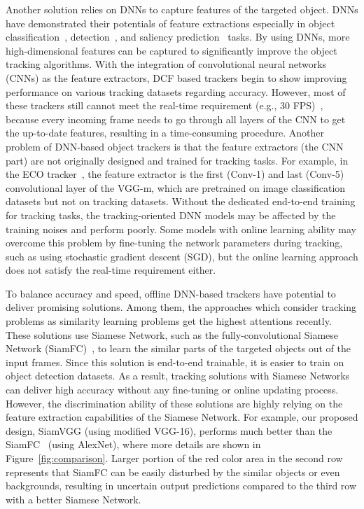 \documentclass[runningheads]{llncs}
\begin{document}
Another solution relies on DNNs to capture features of the targeted object. DNNs have demonstrated their potentials of feature extractions especially in object classification~\cite{krizhevsky2012imagenet}, detection~\cite{redmon2017yolo9000}, and saliency prediction~\cite{li2018csrnet} tasks. By using DNNs, more high-dimensional features can be captured to significantly improve the object tracking algorithms. With the integration of convolutional neural networks (CNNs) as the feature extractors, DCF based trackers begin to show improving performance on various tracking datasets regarding accuracy. However, most of these trackers still cannot meet the real-time requirement (e.g., 30 FPS)~\cite{danelljan2017eco}, because every incoming frame needs to go through all layers of the CNN to get the up-to-date features, resulting in a time-consuming procedure. Another problem of DNN-based object trackers is that the feature extractors (the CNN part) are not originally designed and trained for tracking tasks. For example, in the ECO tracker~\cite{danelljan2017eco}, the feature extractor is the first (Conv-1) and last (Conv-5) convolutional layer of the VGG-m, which are pretrained on image classification datasets but not on tracking datasets. Without the dedicated end-to-end training for tracking tasks, the tracking-oriented DNN models may be affected by the training noises and perform poorly. Some models with online learning ability may overcome this problem by fine-tuning the network parameters during tracking, such as using stochastic gradient descent (SGD), but the online learning approach does not satisfy the real-time requirement either.

To balance accuracy and speed, offline DNN-based trackers have potential to deliver promising solutions. Among them, the approaches which consider tracking problems as similarity learning problems get the highest attentions recently. These solutions use Siamese Network, such as the fully-convolutional Siamese Network (SiamFC)~\cite{bertinetto2016fully}, to learn the similar parts of the targeted objects out of the input frames. Since this solution is end-to-end trainable, it is easier to train on object detection datasets.
As a result, tracking solutions with Siamese Networks can deliver high accuracy without any fine-tuning or online updating process. However, the discrimination ability of these solutions are highly relying on the feature extraction capabilities of the Siamese Network. For example, our proposed design, SiamVGG (using modified VGG-16), performs much better than the SiamFC~\cite{bertinetto2016fully} (using AlexNet), where more details are shown in Figure~\ref{fig:comparison}. 
Larger portion of the red color area in the second row represents that SiamFC can be easily disturbed by the similar objects or even backgrounds, resulting in uncertain output predictions compared to the third row with a better Siamese Network.
\end{document}
